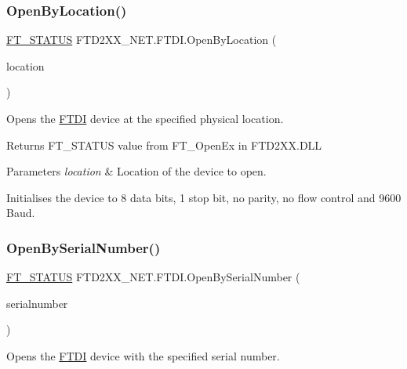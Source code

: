 \subsubsection{\texorpdfstring{OpenByLocation()}{OpenByLocation()}}
{\footnotesize\ttfamily \mbox{\hyperlink{class_f_t_d2_x_x___n_e_t_1_1_f_t_d_i_aabe20ad905cc4ccc1e35dd5b877d9a83}{F\+T\+\_\+\+S\+T\+A\+T\+US}} F\+T\+D2\+X\+X\+\_\+\+N\+E\+T.\+F\+T\+D\+I.\+Open\+By\+Location (\begin{DoxyParamCaption}\item[{U\+Int32}]{location }\end{DoxyParamCaption})}



Opens the \mbox{\hyperlink{class_f_t_d2_x_x___n_e_t_1_1_f_t_d_i}{F\+T\+DI}} device at the specified physical location. 

\begin{DoxyReturn}{Returns}
F\+T\+\_\+\+S\+T\+A\+T\+US value from F\+T\+\_\+\+Open\+Ex in F\+T\+D2\+X\+X.\+D\+LL
\end{DoxyReturn}

\begin{DoxyParams}{Parameters}
{\em location} & Location of the device to open.\\
\hline
\end{DoxyParams}


Initialises the device to 8 data bits, 1 stop bit, no parity, no flow control and 9600 Baud.\mbox{\label{class_f_t_d2_x_x___n_e_t_1_1_f_t_d_i_af70a7ba5bf09ea743c0d9e4f75609dc3}} 
\subsubsection{\texorpdfstring{OpenBySerialNumber()}{OpenBySerialNumber()}}
{\footnotesize\ttfamily \mbox{\hyperlink{class_f_t_d2_x_x___n_e_t_1_1_f_t_d_i_aabe20ad905cc4ccc1e35dd5b877d9a83}{F\+T\+\_\+\+S\+T\+A\+T\+US}} F\+T\+D2\+X\+X\+\_\+\+N\+E\+T.\+F\+T\+D\+I.\+Open\+By\+Serial\+Number (\begin{DoxyParamCaption}\item[{string}]{serialnumber }\end{DoxyParamCaption})}



Opens the \mbox{\hyperlink{class_f_t_d2_x_x___n_e_t_1_1_f_t_d_i}{F\+T\+DI}} device with the specified serial number. 

